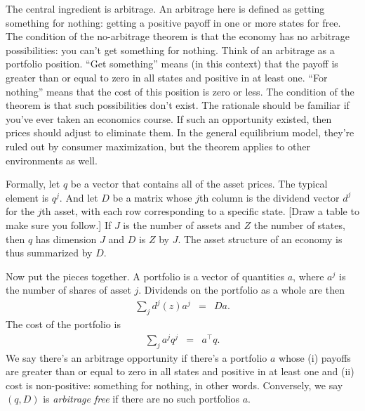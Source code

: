\documentclass[11pt]{article}
\begin{document}
The central ingredient is arbitrage.
An arbitrage here is defined as getting something for nothing:
getting a positive payoff in one or more states for free.
The condition of the no-arbitrage theorem is that the economy has no
arbitrage possibilities:  you can't get something for nothing.
Think of an arbitrage as a portfolio position.
``Get something'' means (in this context) that the payoff is greater than
or equal to zero in all states and positive in at least one.
``For nothing'' means that the cost of this position is zero or less.
The condition of the theorem is that such possibilities don't exist.
The rationale should be familiar if you've ever taken an economics course.
If such an opportunity existed, then prices should adjust to eliminate them.
In the general equilibrium model, they're ruled out by consumer maximization,
but the theorem applies to other environments as well.

Formally, let $q$ be a vector that contains all of the asset prices.
The typical element is $q^j$.
And let $D$ be a matrix whose $j$th column is the dividend
vector $d^j$ for the $j$th asset,
with each row corresponding to a specific state.
[Draw a table to make sure you follow.]
If $J$ is the number of assets and $Z$ the number of states,
then $q$ has dimension $J$ and $D$ is $Z$ by $J$.
The asset structure of an economy is thus summarized by $D$.

Now put the pieces together.
A portfolio is a vector of quantities $a$,
where $a^j$ is the number of shares of asset $j$.
Dividends on the portfolio as a whole are then
\begin{eqnarray*}
    \sum_j d^j(z) a^j &=& D a .
\end{eqnarray*}
The cost of the portfolio is
\begin{eqnarray*}
    \sum_j a^j q^j &=& a^\top q .
\end{eqnarray*}
We say there's an arbitrage opportunity if there's a portfolio $a$
whose (i) payoffs are greater than or equal to zero in all states and positive in at least one
and (ii) cost is non-positive:  something for nothing, in other words.
Conversely, we say $(q,D)$ is {\it arbitrage free\/} if there are no such portfolios $a$.
\end{document}
